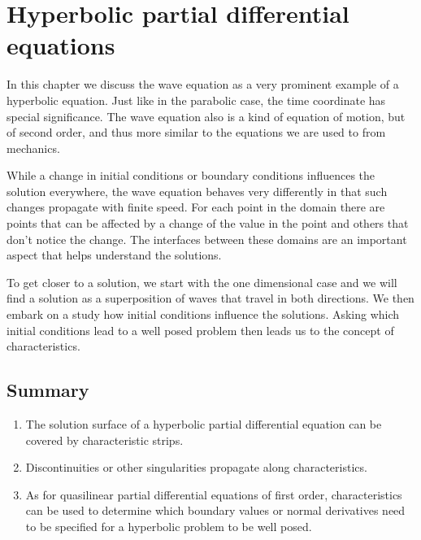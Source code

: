 %
%
%
\chapter{Hyperbolic partial differential equations
\label{chapter-hyperbolisch}}
\rhead{}
In this chapter we discuss the wave equation as a very prominent
example of a hyperbolic equation.
Just like in the parabolic case, the time coordinate has special
significance.
The wave equation also is a kind of equation of motion, but of second
order, and thus more similar to the equations we are used to from
mechanics.

While a change in initial conditions or boundary conditions 
influences the solution everywhere, the wave equation behaves
very differently in that such changes propagate with finite speed.
For each point in the domain there are points that can be affected
by a change of the value in the point and others that don't notice
the change.
The interfaces between these domains are an important aspect that
helps understand the solutions.

To get closer to a solution, we start with the one dimensional case
and we will find a solution as a superposition of waves that travel in
both directions.
We then embark on a study how initial conditions influence the solutions.
Asking which initial conditions lead to a well posed problem then
leads us to the concept of characteristics.









\section{Summary}
\begin{enumerate}
\item
The solution surface of a hyperbolic partial differential equation can be
covered by characteristic strips.
\item
Discontinuities or other singularities propagate along characteristics.
\item
As for quasilinear partial differential equations of first order,
characteristics can be used to determine which boundary values or
normal derivatives need to be specified for a hyperbolic problem to
be well posed.
\end{enumerate}

